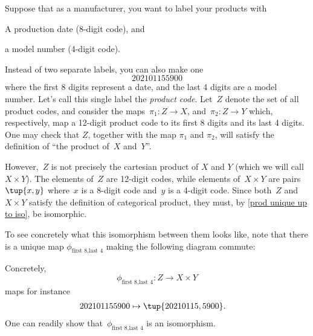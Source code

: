 \begin{example}
  \label{ex univ prop prod}
  Suppose that as a manufacturer, you want to label your products with
  \begin{compactitem}
    \item A production date (8-digit code), and
    \item a model number (4-digit code).
  \end{compactitem}
  Instead of two separate labels, you can also make one
  \begin{equation}\label{eq:exa-prod-univ-prop-code}
    202101155900
  \end{equation}
  where the first 8 digits represent a date, and the last 4 digits are a model number.
  Let's call this single label the \emph{product code}. Let~$Z$ denote the set of all product codes, and consider the maps~$\pi_1\colon Z\to X$, and~$\pi_2\colon Z\to Y$ which, respectively, map a 12-digit product code to its first 8 digits and its last 4 digits. One may check that $Z$, together with the map $\pi_1$ and $\pi_2$, will satisfy the definition of ``the product of~$X$ and~$Y$''.

  \begin{center}
    \label{fig:digits-1}
  \end{center}

  However,~$Z$ is not precisely the cartesian product of $X$ and $Y$ (which we will call $X\times Y$). The elements of~$Z$ are 12-digit codes, while elements of~$X\times Y$ are pairs~$\tup{x,y}$ where~$x$ is a 8-digit code and~$y$ is a 4-digit code. Since both~$Z$ and~$X\times Y$ satisfy the definition of categorical product, they must, by \cref{prod unique up to iso}, be isomorphic.

  \begin{center}
    \label{fig:digits-3}
  \end{center}
  To see concretely what this isomorphism between them looks like, note that there is a unique map $\phi_{\text{first 8},\text{last 4}}$ making the following diagram commute:
  \begin{center}
    \label{fig:digits-2}
  \end{center}

  Concretely,~
 \begin{equation}\label{eq:exa-univ-iso}
 \phi_{\text{first 8},\text{last 4}}: Z \to X\times Y
\end{equation}
maps for instance
  \begin{equation}\label{eq:exa-univ-iso-concrete}
    \begin{aligned}
      202101155900&\mapsto \tup{20210115,5900}.
    \end{aligned}
  \end{equation}
  One can readily show that~$\phi_{\text{first 8},\text{last 4}}$ is an isomorphism.
\end{example}

